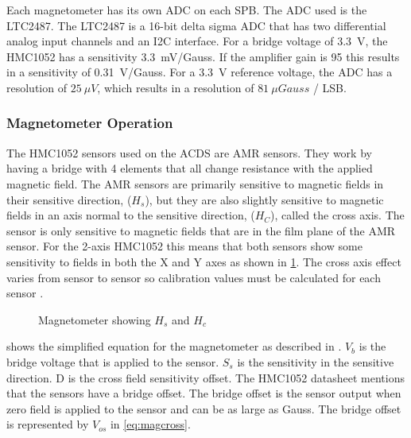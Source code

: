 Each magnetometer has its own \ac{ADC} on each \ac{SPB}. The \ac{ADC} used is the LTC2487. The LTC2487 is a 16-bit delta sigma \ac{ADC} that has two differential analog input channels and an \ac{I2C} interface. For a bridge voltage of 3.3~V, the HMC1052 has a sensitivity 3.3~mV/Gauss. If the amplifier gain is 95 this results in a sensitivity of 0.31~V/Gauss. For a 3.3~V reference voltage, the \ac{ADC} has a resolution of $25~\unit{\mu V}$, which results in a resolution of $81~\unit{\mu Gauss}$ / LSB.

\subsubsection{Magnetometer Operation}

The HMC1052 sensors used on the \ac{ACDS} are \ac{AMR} sensors. They work by having a bridge with 4 elements that all change resistance with the applied magnetic field. The \ac{AMR} sensors are primarily sensitive to magnetic fields in their sensitive direction, ($H_s$), but they are also slightly sensitive to magnetic fields in an axis normal to the sensitive direction, ($H_C$), called the cross axis. The sensor is only sensitive to magnetic fields that are in the film plane of the \ac{AMR} sensor. For the 2-axis HMC1052 this means that both sensors show some sensitivity to fields in both the X and Y axes as shown in \cref{fig:magAxisCross}. The cross axis effect varies from sensor to sensor so calibration values must be calculated for each sensor \cite{AN215}.

\begin{figure}[H]
    \centering
    \caption{Magnetometer showing $H_s$ and $H_c$}
    \label{fig:magAxisCross}
\end{figure}

 shows the simplified equation for the magnetometer as described in \cite{AN215}. $V_b$ is the bridge voltage that is applied to the sensor. $S_s$ is the sensitivity in the sensitive direction. D is the cross field sensitivity offset. The HMC1052 datasheet\cite{HMC1052} mentions that the sensors have a bridge offset. The bridge offset is the sensor output when zero field is applied to the sensor and can be as large as  Gauss. The bridge offset is represented by $V_{os}$ in \cref{eq:magcross}.

